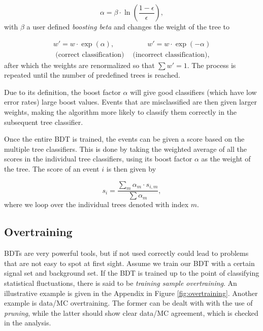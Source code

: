 \begin{equation}
\label{eq:boostfactor}
\alpha = \beta \cdot \ln\left(\frac{1-\epsilon}{\epsilon}\right),
\end{equation}
\noindent with $\beta$ a user defined \textit{boosting beta} and changes the weight of the tree to

\begin{equation}
\begin{split}
w' = w \cdot \exp(\alpha), \ \ \ \ \ \ \ \ \ \ \ \ \ \ \ \ \ \ \ \ \ w' = w \cdot \exp(-\alpha)\\
\textrm{ (correct classification)} \ \ \ \ \textrm{ (incorrect classification),}
\end{split}
\end{equation}
\noindent after which the weights are renormalized so that $\sum w' = 1$. The process is repeated until the number of predefined trees is reached.

Due to its definition, the boost factor $\alpha$ will give good classifiers (which have low error rates) large boost values. Events that are misclassified are then given larger weights, making the algorithm more likely to classify them correctly in the subsequent tree classifier.

Once the entire BDT is trained, the events can be given a score based on the multiple tree classifiers. This is done by taking the weighted average of all the scores in the individual tree classifiers, using its boost factor $\alpha$ as the weight of the tree. The score of an event $i$ is then given by

\begin{equation}
s_i = \frac{\sum_m \alpha_m \cdot s_{i,m}}{\sum \alpha_m},
\end{equation}
\noindent where we loop over the individual trees denoted with index $m$.

\subsection{Overtraining}
\label{subsec:overtraining}
BDTs are very powerful tools, but if not used correctly could lead to problems that are not easy to spot at first sight. Assume we train our BDT with a certain signal set and background set. If the BDT is trained up to the point of classifying statistical fluctuations, there is said to be \textit{training sample overtraining}. An illustrative example is given in the Appendix in Figure \ref{fig:overtraining}. Another example is data/MC overtraining. The former can be dealt with with the use of \textit{pruning}, while the latter should show clear data/MC agreement, which is checked in the analysis. 

